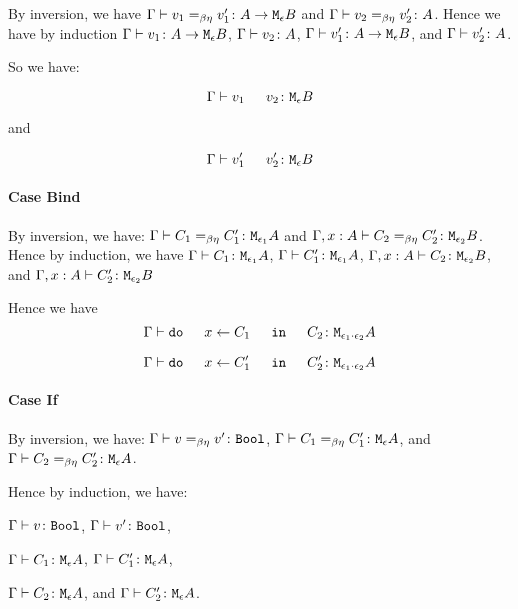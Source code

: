 {        By inversion, we have $\Gamma \vdash v_1 =_{\beta\eta} v_1' \colon A \rightarrow \texttt{M}_{\epsilon}{B}$ and $\Gamma \vdash v_2 =_{\beta\eta} v_2' \colon A$. Hence we have by induction $\Gamma \vdash v_1 \colon A \rightarrow \texttt{M}_{\epsilon}{B}$, $\Gamma \vdash v_2 \colon A$, $\Gamma \vdash v_1' \colon A \rightarrow \texttt{M}_{\epsilon}{B}$, and $\Gamma \vdash v_2' \colon A$.

        So we have:

        \begin{equation}
            \gtyperelation{\apply{v_1}{v_2}}{\meb}
        \end{equation}

        and

        
        \begin{equation}
            \gtyperelation{\apply{v_1'}{v_2'}}{\meb}
        \end{equation}

    \paragraph{Case Bind}
        By inversion, we have:
        $\Gamma \vdash C_1 =_{\beta\eta} C_1' \colon \texttt{M}_{\epsilon_1}{A}$ and
        $\Gamma, x: A \vdash C_2 =_{\beta\eta} C_2' \colon \texttt{M}_{\epsilon_2}{B}$.
        Hence by induction, we have 
        $\Gamma \vdash C_1 \colon \texttt{M}_{\epsilon_1}{A}$,
        $\Gamma \vdash C_1' \colon \texttt{M}_{\epsilon_1}{A}$,
        $\Gamma, x: A \vdash C_2 \colon \texttt{M}_{\epsilon_2}{B}$, and 
        $\Gamma, x: A \vdash C_2' \colon \texttt{M}_{\epsilon_2}{B}$

        Hence we have 
        \begin{equation}
            \gtyperelation{\doin{x}{C_1}{C_2}}{\M{\e_1\dot\e_2}{A}}
        \end{equation}

        
        \begin{equation}
            \gtyperelation{\doin{x}{C_1'}{C_2'}}{\M{\e_1\dot\e_2}{A}}
        \end{equation}
    \paragraph{Case If}
    By inversion, we have:
    $\Gamma \vdash v =_{\beta\eta} v' \colon \texttt{Bool}$,
    $\Gamma \vdash C_1 =_{\beta\eta} C_1' \colon \texttt{M}_{\epsilon}{A}$, and
    $\Gamma \vdash C_2 =_{\beta\eta} C_2' \colon \texttt{M}_{\epsilon}{A}$.

    Hence by induction, we have:

    $\Gamma \vdash v \colon \texttt{Bool}$,
    $\Gamma \vdash v' \colon \texttt{Bool}$,

    $\Gamma \vdash C_1 \colon \texttt{M}_{\epsilon}{A}$,
    $\Gamma \vdash C_1' \colon \texttt{M}_{\epsilon}{A}$,

    
    $\Gamma \vdash C_2 \colon \texttt{M}_{\epsilon}{A}$, and
    $\Gamma \vdash C_2' \colon \texttt{M}_{\epsilon}{A}$.

}
